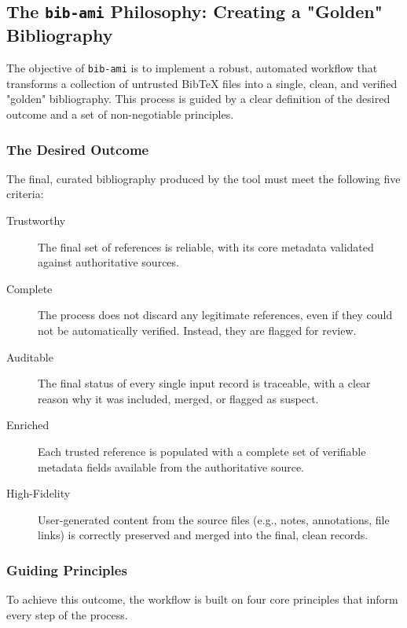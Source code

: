 \documentclass[11pt, a4paper]{article}
\begin{document}
\subsection{The \texttt{bib-ami} Philosophy: Creating a "Golden" Bibliography}

The objective of \texttt{bib-ami} is to implement a robust, automated workflow that transforms a collection of untrusted BibTeX files into a single, clean, and verified "golden" bibliography. This process is guided by a clear definition of the desired outcome and a set of non-negotiable principles.

\subsubsection{The Desired Outcome}
The final, curated bibliography produced by the tool must meet the following five criteria:

\begin{description}
    \item[Trustworthy] The final set of references is reliable, with its core metadata validated against authoritative sources.
    \item[Complete] The process does not discard any legitimate references, even if they could not be automatically verified. Instead, they are flagged for review.
    \item[Auditable] The final status of every single input record is traceable, with a clear reason why it was included, merged, or flagged as suspect.
    \item[Enriched] Each trusted reference is populated with a complete set of verifiable metadata fields available from the authoritative source.
    \item[High-Fidelity] User-generated content from the source files (e.g., notes, annotations, file links) is correctly preserved and merged into the final, clean records.
\end{description}

\subsubsection{Guiding Principles}
To achieve this outcome, the workflow is built on four core principles that inform every step of the process.
\end{document}
